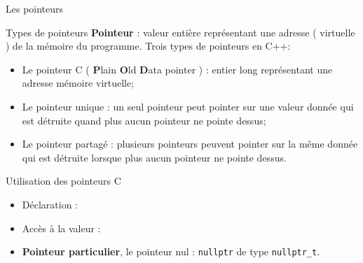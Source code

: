 \documentclass[handout,10pt]{beamer}
\newcommand{\includepartcode}[4][cpp]{

}
\begin{document}
\begin{frame}[fragile]{Les pointeurs}
\tiny
\begin{block}{Types de pointeurs}
\textbf{Pointeur} : valeur entière représentant une adresse ( virtuelle ) de la mémoire du programme.
Trois types de pointeurs en C++:
\begin{itemize}
\item {\color{blue}Le pointeur C} ( {\bf P}lain {\bf O}ld {\bf D}ata pointer ) : entier long représentant une adresse mémoire virtuelle;
\item {\color{blue}Le pointeur unique} : {\color{red} un seul pointeur} peut pointer sur {\color{red}une valeur donnée} qui est détruite quand plus aucun pointeur ne pointe dessus;
\item {\color{blue}Le pointeur partagé} : {\color{red}plusieurs pointeurs} peuvent pointer sur la {\color{red}même donnée} qui est détruite lorsque plus aucun pointeur ne pointe dessus.
\end{itemize}
\end{block}

\begin{block}{Utilisation des pointeurs C}
\begin{itemize}
\item Déclaration :
\includepartcode{pointeurs.cpp}{7}{13}
\item Accès à la valeur :
\includepartcode{pointeurs.cpp}{17}{18}
\item \textbf{Pointeur particulier}, le pointeur nul : \lstinline$nullptr$ de type \lstinline$nullptr_t$.
\end{itemize}
\end{block}
\end{frame}
\end{document}
